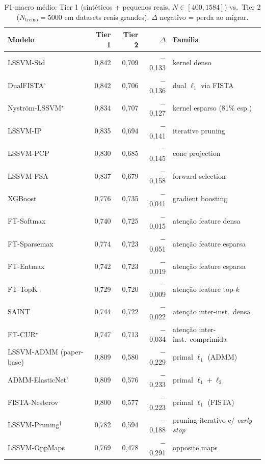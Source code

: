 \documentclass[12pt,a4paper]{article}
\begin{document}
\begin{table}[H]
\centering
\caption{F1-macro médio: Tier 1 (sintéticos + pequenos reais, $N \in [400, 1584]$)
vs.\ Tier 2 ($N_{\text{treino}}=5000$ em datasets reais grandes).
$\Delta$ negativo = perda ao migrar.}
\label{tab:tier1_vs_tier2}
\begin{tabular}{lrrrl}
\toprule
\textbf{Modelo} & \textbf{Tier 1} & \textbf{Tier 2} & \textbf{$\Delta$} & \textbf{Família} \\
\midrule
LSSVM-Std            & 0,842 & 0,709 & $-$0,133 & kernel denso \\
DualFISTA$^\circ$    & 0,842 & 0,706 & $-$0,136 & dual $\ell_1$ via FISTA \\
Nyström-LSSVM$^\star$ & 0,834 & 0,707 & $-$0,127 & kernel esparso (81\% esp.) \\
LSSVM-IP             & 0,835 & 0,694 & $-$0,141 & iterative pruning \\
LSSVM-PCP            & 0,830 & 0,685 & $-$0,145 & cone projection \\
LSSVM-FSA            & 0,837 & 0,679 & $-$0,158 & forward selection \\
\midrule
XGBoost              & 0,776 & 0,735 & $-$0,041 & gradient boosting \\
FT-Softmax           & 0,740 & 0,725 & $-$0,015 & atenção feature densa \\
FT-Sparsemax         & 0,774 & 0,723 & $-$0,051 & atenção feature esparsa \\
FT-Entmax            & 0,742 & 0,723 & $-$0,019 & atenção feature esparsa \\
FT-TopK              & 0,729 & 0,720 & $-$0,009 & atenção feature top-$k$ \\
SAINT                & 0,744 & 0,722 & $-$0,022 & atenção inter-inst.\ densa \\
FT-CUR$^\star$       & 0,747 & 0,713 & $-$0,034 & atenção inter-inst.\ comprimida \\
\midrule
LSSVM-ADMM (paper-base)  & 0,809 & 0,580 & $-$0,229 & primal $\ell_1$ (ADMM) \\
ADMM-ElasticNet$^\circ$ & 0,809 & 0,576 & $-$0,233 & primal $\ell_1+\ell_2$ \\
FISTA-Nesterov            & 0,800 & 0,577 & $-$0,223 & primal $\ell_1$ (FISTA) \\
LSSVM-Pruning$^\dagger$   & 0,782 & 0,594 & $-$0,188 & pruning iterativo c/ \emph{early stop} \\
LSSVM-OppMaps             & 0,769 & 0,478 & $-$0,291 & opposite maps \\
\bottomrule
\end{tabular}
\end{table}
\end{document}
